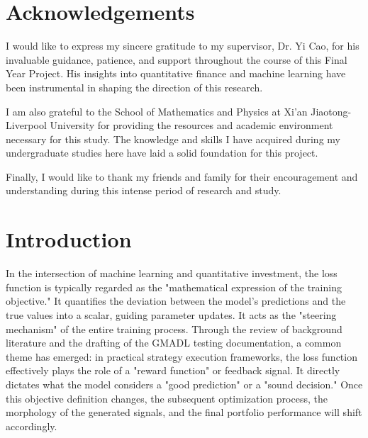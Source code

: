 \documentclass[openany]{book}
\numberwithin{figure}{chapter}
\numberwithin{equation}{chapter}
\begin{document}
\newpage

\chapter*{Acknowledgements}

I would like to express my sincere gratitude to my supervisor, Dr. Yi Cao, for his invaluable guidance, patience, and support throughout the course of this Final Year Project. His insights into quantitative finance and machine learning have been instrumental in shaping the direction of this research.

I am also grateful to the School of Mathematics and Physics at Xi'an Jiaotong-Liverpool University for providing the resources and academic environment necessary for this study. The knowledge and skills I have acquired during my undergraduate studies here have laid a solid foundation for this project.

Finally, I would like to thank my friends and family for their encouragement and understanding during this intense period of research and study.

\tableofcontents
\listoffigures
\listoftables
\newpage
{}

\chapter{Introduction}

In the intersection of machine learning and quantitative investment, the loss function is typically regarded as the "mathematical expression of the training objective." It quantifies the deviation between the model's predictions and the true values into a scalar, guiding parameter updates. It acts as the "steering mechanism" of the entire training process. Through the review of background literature and the drafting of the GMADL testing documentation, a common theme has emerged: in practical strategy execution frameworks, the loss function effectively plays the role of a "reward function" or feedback signal. It directly dictates what the model considers a "good prediction" or a "sound decision." Once this objective definition changes, the subsequent optimization process, the morphology of the generated signals, and the final portfolio performance will shift accordingly.
\end{document}
